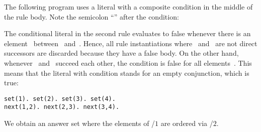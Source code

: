 \begin{example}\label{ex:sort}
The following program uses a literal with a composite condition in the middle of the rule body.
Note the semicolon ``\code{;}'' after the condition:
%

%
The conditional literal in the second rule evaluates to false
whenever there is an element~ between~ and~.
Hence, all rule instantiations where~ and~ are not direct successors are discarded
because they have a false body.
On the other hand, whenever~ and~ succeed each other,
the condition is false for all elements~.
This means that the literal with condition stands for an empty conjunction, which is true:%
%
\begin{lstlisting}[numbers=none]
set(1). set(2). set(3). set(4).
next(1,2). next(2,3). next(3,4).
\end{lstlisting}
We obtain an answer set where the elements of /$1$ are ordered via /$2$.
\eexample
\end{example}

